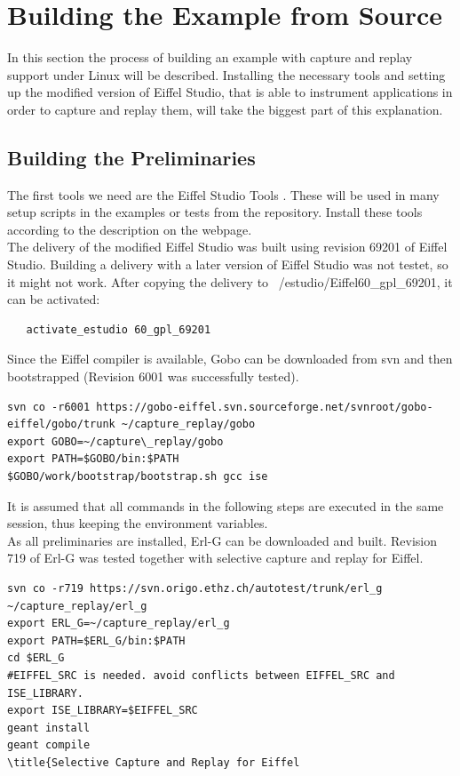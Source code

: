 \section{Building the Example from Source}
\sloppy %
In this section the process of building an example with capture and replay support under Linux will be described. Installing the necessary tools and setting up the modified version of Eiffel Studio, that is able to instrument applications in order to capture and replay them, will take the biggest part of this explanation.\\


\subsection{Building the Preliminaries}
The first tools we need are the  Eiffel Studio Tools \cite{estudiotools}. These will be used in many setup scripts in the examples or tests from the repository. Install these tools according to the description on the webpage.\\

The delivery of the modified Eiffel Studio was built using revision 69201 of Eiffel Studio. Building a delivery with a later version of Eiffel Studio was not testet, so it might not work. After copying the delivery to ~/estudio/Eiffel60\_gpl\_69201, it can be activated:
\bashlisting
\begin{lstlisting}
   activate_estudio 60_gpl_69201
\end{lstlisting}

Since the Eiffel compiler is available, Gobo \cite{gobo} can be downloaded from svn and then bootstrapped (Revision 6001 was successfully tested).
\begin{lstlisting}
svn co -r6001 https://gobo-eiffel.svn.sourceforge.net/svnroot/gobo-eiffel/gobo/trunk ~/capture_replay/gobo
export GOBO=~/capture\_replay/gobo
export PATH=$GOBO/bin:$PATH
$GOBO/work/bootstrap/bootstrap.sh gcc ise
\end{lstlisting}

It is assumed that all commands in the following steps are executed in the same session, thus keeping the environment variables.\\
As all preliminaries are installed, Erl-G \cite{erlg} can be downloaded and built. Revision 719 of Erl-G was tested together with selective capture and replay for Eiffel.
\begin{lstlisting}
svn co -r719 https://svn.origo.ethz.ch/autotest/trunk/erl_g ~/capture_replay/erl_g
export ERL_G=~/capture_replay/erl_g
export PATH=$ERL_G/bin:$PATH
cd $ERL_G
#EIFFEL_SRC is needed. avoid conflicts between EIFFEL_SRC and ISE_LIBRARY.
export ISE_LIBRARY=$EIFFEL_SRC
geant install
geant compile
\title{Selective Capture and Replay for Eiffel
\end{lstlisting}

